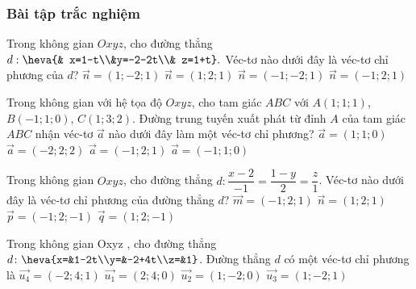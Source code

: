 	\subsubsection{Bài tập trắc nghiệm}
	\begin{ex}%
	Trong không gian $Oxyz$, cho đường thẳng $d: \heva{& x=1-t\\&y=-2-2t\\& z=1+t}. $ Véc-tơ nào dưới đây là véc-tơ chỉ phương của $d$? 
	\choice
	{$\vec{n}=(1;-2;1)$}
	{$\vec{n}=(1;2;1)$}
	{\True $\vec{n}=(-1;-2;1)$}
	{$\vec{n}=(-1;2;1)$}
	\end{ex}
	\begin{ex}%
	Trong không gian với hệ tọa độ $Oxyz$, cho tam giác $ABC$ với $A(1;1;1)$, $B(-1;1;0)$, $C(1;3;2)$. Đường trung tuyến xuất phát từ đỉnh $A$ của tam giác $ABC$ nhận véc-tơ $\overrightarrow{a}$ nào dưới đây làm một véc-tơ chỉ phương?
	\choice
	{$\overrightarrow{a}=(1;1;0)$}
	{$\overrightarrow{a}=(-2;2;2)$}
	{$\overrightarrow{a}=(-1;2;1)$}
	{\True $\overrightarrow{a}=(-1;1;0)$}
	\end{ex}
	\begin{ex}%
	Trong không gian $Oxyz$, cho đường thẳng $d:\dfrac{x-2}{-1}=\dfrac{1-y}{2}=\dfrac{z}{1}$. Véc-tơ nào dưới đây là véc-tơ chỉ phương của đường thẳng $d$?
	\choice
	{$\vec{m}=(-1;2;1)$}
	{$\vec{n}=(1;2;1)$}
	{$\vec{p}=(-1;2;-1)$}
	{\True $\vec{q}=(1;2;-1)$}
	\end{ex}
	\begin{ex}%
	Trong không gian Oxyz , cho đường thẳng $d\colon\heva{x=&1-2t\\y=&-2+4t\\z=&1}$. Đường thẳng $d$ có một véc-tơ chỉ phương là
	\choice
	{$\vec{u_4}=(-2;4;1)$}
	{$\vec{u_1}=(2;4;0)$}
	{\True $\vec{u_2}=(1;-2;0)$}
	{$\vec{u_3}=(1;-2;1)$}
	\end{ex}
